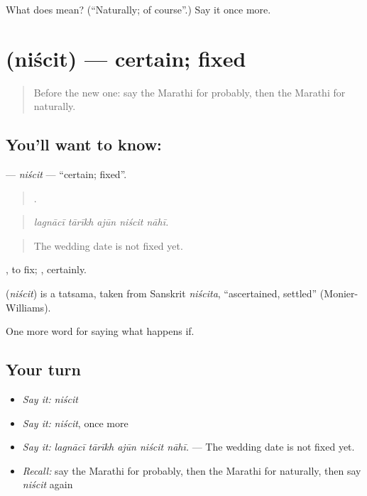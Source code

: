 \begin{tcolorbox}[breakable,colback=teal!4,colframe=teal!35!black,title={Before you move on}]
What does  mean? (\textquotedblleft{}Naturally; of course\textquotedblright{}.) Say it once more.
\end{tcolorbox}
\section[\texorpdfstring{\mr{निश्चित} (niścit)}{निश्चित (niścit)}]{ (niścit) — certain; fixed}

\label{lesson:MR-C382-niscit}



\begin{quote}
Before the new one: say the Marathi for probably, then the Marathi for naturally.
\end{quote}

\subsection*{You'll want to know: }
\textbf{} — \emph{niścit} — \textquotedblleft{}certain; fixed\textquotedblright{}.

\begin{quote}
    .
\end{quote}

\begin{quote}
\emph{lagnācī tārīkh ajūn niścit nāhī.}
\end{quote}

\begin{quote}
The wedding date is not fixed yet.
\end{quote}

 , to fix; , certainly.

\begin{cousinweb}
\textbf{} (\emph{niścit}) is a tatsama, taken from Sanskrit \emph{niścita}, \textquotedblleft{}ascertained, settled\textquotedblright{} (Monier-Williams).
\end{cousinweb}

\begin{grammarlens}[title={What you've built}]
One more word for saying what happens if.
\end{grammarlens}

\subsection*{Your turn}
\begin{itemize}
\raggedright
  \item \emph{Say it:} \emph{niścit}
  \item \emph{Say it:} \emph{niścit}, once more
  \item \emph{Say it:} \emph{lagnācī tārīkh ajūn niścit nāhī.} — The wedding date is not fixed yet.
  \item \emph{Recall:} say the Marathi for probably, then the Marathi for naturally, then say \emph{niścit} again
\end{itemize}

